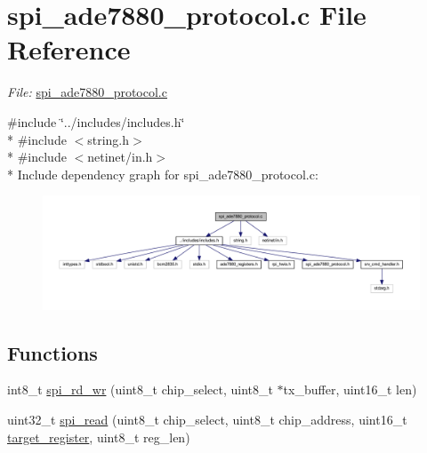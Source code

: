\hypertarget{a00040}{\section{spi\-\_\-ade7880\-\_\-protocol.\-c File Reference}
\label{db/d3a/a00040}
}


{\itshape File\-:} \hyperlink{a00040}{spi\-\_\-ade7880\-\_\-protocol.\-c} \par
  


{\ttfamily \#include \char`\"{}../includes/includes.\-h\char`\"{}}\\*
{\ttfamily \#include $<$string.\-h$>$}\\*
{\ttfamily \#include $<$netinet/in.\-h$>$}\\*
Include dependency graph for spi\-\_\-ade7880\-\_\-protocol.\-c\-:\nopagebreak
\begin{figure}[H]
\begin{center}
\leavevmode
\includegraphics[width=350pt]{d2/d79/a00051}
\end{center}
\end{figure}
\subsection*{Functions}
{\bf }\par
\begin{DoxyCompactItemize}
\item 
int8\-\_\-t \hyperlink{a00007_gadd297682b87478aed2d07f4f536353c1}{spi\-\_\-rd\-\_\-wr} (uint8\-\_\-t chip\-\_\-select, uint8\-\_\-t $\ast$tx\-\_\-buffer, uint16\-\_\-t len)
\begin{DoxyCompactList}\small\item\em 

 \end{DoxyCompactList}\end{DoxyCompactItemize}

{\bf }\par
\begin{DoxyCompactItemize}
\item 
uint32\-\_\-t \hyperlink{a00007_ga7ad9f65ee46aca507374096506a0b1c4}{spi\-\_\-read} (uint8\-\_\-t chip\-\_\-select, uint8\-\_\-t chip\-\_\-address, uint16\-\_\-t \hyperlink{a00041_ac02048009fa6718e40f028b6bae63f3d}{target\-\_\-register}, uint8\-\_\-t reg\-\_\-len)
\begin{DoxyCompactList}\small\item\em 

 \end{DoxyCompactList}\end{DoxyCompactItemize}

